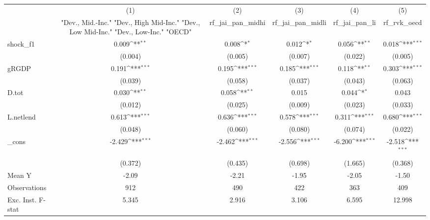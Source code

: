 {
\def\sym#1{\ifmmode^{#1}\else\(^{#1}\)\fi}
\begin{tabular}{l*{5}{c}}
\toprule
            &\multicolumn{1}{c}{(1)}&\multicolumn{1}{c}{(2)}&\multicolumn{1}{c}{(3)}&\multicolumn{1}{c}{(4)}&\multicolumn{1}{c}{(5)}\\
            &\multicolumn{1}{c}{ "Dev., Mid.-Inc." "Dev., High Mid-Inc." "Dev., Low Mid-Inc." "Dev., Low-Inc." "OECD" }&\multicolumn{1}{c}{rf\_jai\_pan\_midhi}&\multicolumn{1}{c}{rf\_jai\_pan\_midli}&\multicolumn{1}{c}{rf\_jai\_pan\_li}&\multicolumn{1}{c}{rf\_rvk\_oecd}\\
\midrule
shock\_f1    &       0.009\sym{**} &       0.008\sym{*}  &       0.012\sym{*}  &       0.056\sym{**} &       0.018\sym{***}\\
            &     (0.004)         &     (0.005)         &     (0.007)         &     (0.022)         &     (0.005)         \\
\addlinespace
gRGDP       &       0.191\sym{***}&       0.195\sym{***}&       0.185\sym{***}&       0.118\sym{**} &       0.303\sym{***}\\
            &     (0.039)         &     (0.058)         &     (0.037)         &     (0.043)         &     (0.063)         \\
\addlinespace
D.tot       &       0.030\sym{**} &       0.058\sym{**} &       0.015         &       0.044\sym{*}  &       0.043         \\
            &     (0.012)         &     (0.025)         &     (0.009)         &     (0.023)         &     (0.033)         \\
\addlinespace
L.netlend   &       0.613\sym{***}&       0.636\sym{***}&       0.578\sym{***}&       0.311\sym{***}&       0.680\sym{***}\\
            &     (0.048)         &     (0.060)         &     (0.080)         &     (0.074)         &     (0.022)         \\
\addlinespace
\_cons      &      -2.429\sym{***}&      -2.462\sym{***}&      -2.556\sym{***}&      -6.200\sym{***}&      -2.518\sym{***}\\
            &     (0.372)         &     (0.435)         &     (0.698)         &     (1.665)         &     (0.368)         \\
\midrule
Mean Y      &       -2.09         &       -2.21         &       -1.95         &       -2.05         &       -1.50         \\
Observations&         912         &         490         &         422         &         363         &         409         \\
Exc. Inst. F-stat&       5.345         &       2.916         &       3.106         &       6.595         &      12.998         \\
\bottomrule
\end{tabular}
}
